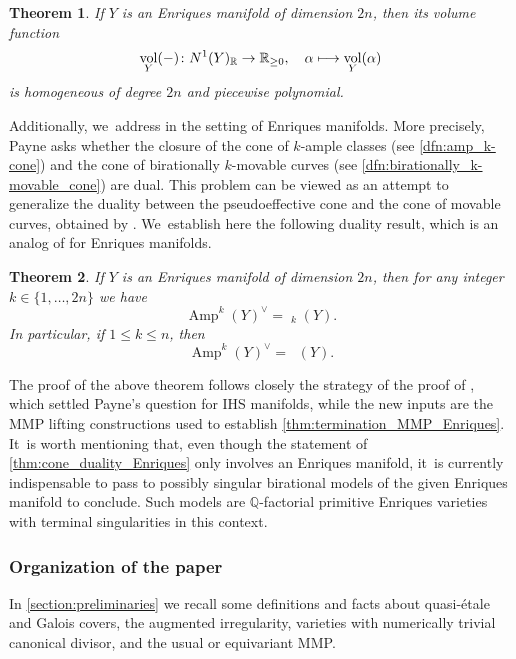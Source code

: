 \documentclass[JEP,XML,SOM,Unicode,published]{cedram}
\newcommand\mto{\mathchoice{\longmapsto}{\mapsto}{\mapsto}{\mapsto}}
\theoremstyle{plain}
\newtheorem{thm}{Theorem}[section]
\theoremstyle{definition}
\newcommand{\Q}{\mathbb{Q}}
\newcommand{\R}{\mathbb{R}}
\DeclareMathOperator{\vol}{vol}
\DeclareMathOperator{\Amp}{\mathrm{Amp}}
\DeclareMathOperator{\NEb}{\overline{\mathrm{NE}}}
\DeclareMathOperator{\bMobc}{\overline{\mathrm{bMob}}}
\begin{document}
\begin{thm}
\label{thm:volume_function_Enriques}
If $Y$ is an Enriques manifold of dimension $2n$, then its volume function\vspace*{-3pt}
\[
\vol_Y(-) \colon N^1(Y)_\R \to \R_{\geq 0}, \quad \alpha \mto \vol_Y(\alpha)
\]
is homogeneous of degree $2n$ and piecewise polynomial.
\end{thm}

Additionally, we~address \cite[Problem]{Payne06} in the setting of Enriques manifolds. More precisely, Payne asks whether the closure of the cone of $k$\nobreakdash-ample classes (see \autoref{dfn:amp_k-cone}) and the cone of birationally $k$\nobreakdash-movable curves (see \autoref{dfn:birationally_k-movable_cone}) are dual. This problem can be viewed as an attempt to generalize the duality between the pseudoeffective cone and the cone of movable curves, obtained by \cite[Th.\,2.2]{BDPP13}. We~establish here the following duality result, which is an analog of \cite[Th.\,B]{DRO25} for Enriques manifolds.

\begin{thm}
\label{thm:cone_duality_Enriques}
If $Y$ is an Enriques manifold of dimension $2n$, then for any integer
$k \in \{ 1, \dots, 2n \}$
we have
\[
\Amp^k(Y)^{\vee} = \bMobc_k(Y).
\]
In particular, if $1 \leq k \leq n$, then
\[
\Amp^k(Y)^{\vee} = \NEb(Y).
\]
\end{thm}

The proof of the above theorem follows closely the strategy of the proof of \cite[Th.\,B]{DRO25}, which settled Payne's question for IHS manifolds, while the new inputs are the MMP lifting constructions used to establish \autoref{thm:termination_MMP_Enriques}. It~is worth mentioning that, even though the statement of \autoref{thm:cone_duality_Enriques} only involves an Enriques manifold, it~is currently indispensable to pass to possibly singular birational models of the given Enriques manifold to conclude. Such models are $\Q$\nobreakdash-factorial primitive Enriques varieties with terminal singularities in this context.

\subsubsection*{Organization of the paper}
In \autoref{section:preliminaries} we recall some definitions and facts about quasi-étale and Galois covers, the augmented irregularity, varieties with numerically trivial canonical divisor, and the usual or equivariant MMP.
\end{document}
